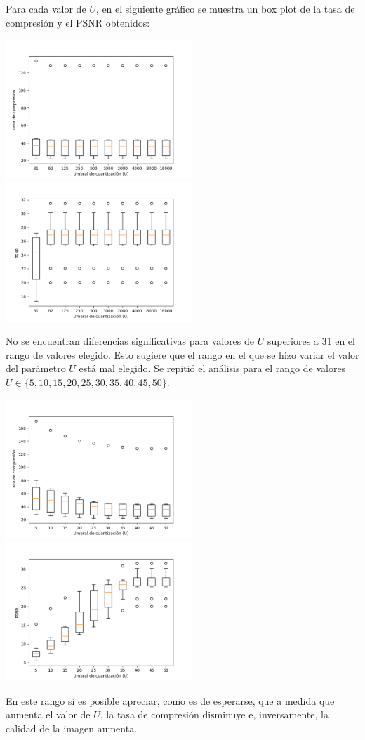 \documentclass{article}
\newcommand{\set}[1]{\{#1\}}
\begin{document}
Para cada valor de $U$, en el siguiente gráfico se muestra un
box plot de la tasa de compresión y el PSNR obtenidos:\\
\begin{center}
\includegraphics[width=7cm]{../imgs/output/gray_plots/u_rate.png}
\includegraphics[width=7cm]{../imgs/output/gray_plots/u_psnr.png}
\end{center}

No se encuentran diferencias significativas para valores de $U$
superiores a 31 en el rango de valores elegido.
Esto sugiere que el rango en el que se hizo variar el valor del
parámetro $U$
está mal elegido.
Se repitió el análisis para el rango de valores
$U \in \set{5, 10, 15, 20, 25, 30, 35, 40, 45, 50}$.
\begin{center}
\includegraphics[width=7cm]{../imgs/output/gray_plots/ualt_rate.png}
\includegraphics[width=7cm]{../imgs/output/gray_plots/ualt_psnr.png}
\end{center}
En este rango sí es posible apreciar, como es de esperarse, que
a medida que aumenta el valor de $U$,
la tasa de compresión disminuye e, inversamente, la calidad de
la imagen aumenta.
\end{document}
